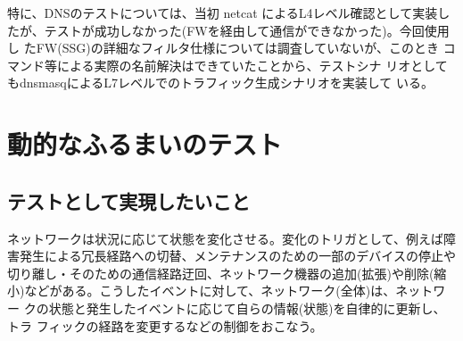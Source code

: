 特に、DNSのテストについては、当初 netcat によるL4レベル確認として実装し
たが、テストが成功しなかった(FWを経由して通信ができなかった)。今回使用し
たFW(SSG)の詳細なフィルタ仕様については調査していないが、このとき
コマンド等による実際の名前解決はできていたことから、テストシナ
リオとしてもdnsmasqによるL7レベルでのトラフィック生成シナリオを実装して
いる。

 \section{動的なふるまいのテスト}

  \subsection{テストとして実現したいこと}
  \label{sec:dynamic-test-target}
ネットワークは状況に応じて状態を変化させる。変化のトリガとして、例えば障
害発生による冗長経路への切替、メンテナンスのための一部のデバイスの停止や
切り離し・そのための通信経路迂回、ネットワーク機器の追加(拡張)や削除(縮
小)などがある。こうしたイベントに対して、ネットワーク(全体)は、ネットワー
クの状態と発生したイベントに応じて自らの情報(状態)を自律的に更新し、トラ
フィックの経路を変更するなどの制御をおこなう。


